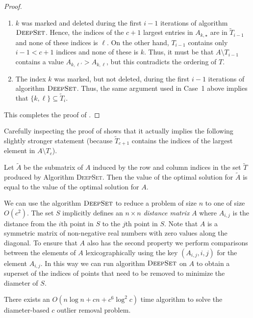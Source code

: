 \documentclass{elsart}
\begin{document}
\begin{proof}
\begin{enumerate}
\begin{enumerate}

\item $k$ was marked and deleted during the first $i-1$ iterations of
algorithm $\textsc{DeepSet}$. Hence, the indices of the $c+1$ largest
entries in $A_{k,\star}$ are in $\tilde{T}_{i-1}$ and none of these
indices is $\ell$.  On the other hand, $T_{i-1}$ contains only $i-1 <
c+1$ indices and none of these is $k$.  Thus, it must be that
$A\setminus T_{i-1}$ contains a value 
$A_{k,\ell'}>A_{k,\ell}$, but this contradicts the ordering of $T$.

\item The index $k$ was marked, but not deleted, during the first
$i-1$ iterations of algorithm $\textsc{DeepSet}$.  Thus, the same
argument used in Case~1 above implies that $\{k,\ell\}\subseteq
\tilde{T}_i$.

\end{enumerate}
\end{enumerate}
This completes the proof of .
\end{proof} 

Carefully inspecting the proof of  shows that it
actually implies the following slightly stronger statement (because
$\tilde{T}_{c+1}$ contains the indices of the largest element in
$A\setminus T_c$).

\begin{lem}
Let $\tilde{A}$ be the submatrix of $A$ induced by the row and column
indices in the set $\tilde{T}$ produced by Algorithm \textsc{DeepSet}.
Then the value of the optimal solution for $\tilde{A}$ is equal to the
value of the optimal solution for $A$.
\end{lem}

We can use the algorithm $\textsc{DeepSet}$ to reduce a problem of
size $n$ to one of size $O(c^2)$.  The set $S$ implicitly defines an
$n\times n$ \emph{distance matrix} $A$ where $A_{i,j}$ is the distance
from the $i$th point in $S$ to the $j$th point in $S$.  Note that $A$
is a symmetric matrix of non-negative real numbers with zero values
along the diagonal.  To ensure that $A$ also has the second property
we perform comparisons between the elements of $A$ lexicographically
using the key $(A_{i,j}, i, j)$ for the element $A_{i,j}$.  In this
way we can run algorithm $\textsc{DeepSet}$ on $A$ to obtain a
superset of the indices of points that need to be removed to minimize
the diameter of $S$.

\begin{lem}
There exists an $O(n\log n + cn + c^6\log^2 c)$ time algorithm to
solve the diameter-based $c$ outlier removal problem.
\end{lem}
\end{document}
